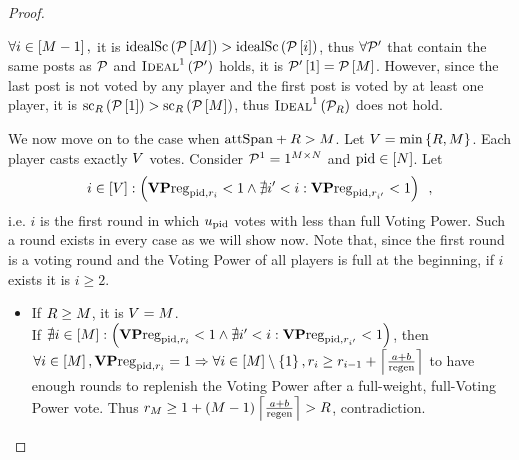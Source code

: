 \begin{proof}
\begin{itemize}
    $\forall i \in \left[\postlen - 1\right],$ it is
    $\idsc{\postlist\left[\postlen\right]} >
    \idsc{\postlist\left[i\right]}$, thus $\forall \postlist'$ that
    contain the same posts as $\postlist$ and
    $\textsc{Ideal}^1\left(\postlist'\right)$ holds, it is
    $\postlist'\left[1\right] = \postlist\left[\postlen\right]$. However,
    since the last post is not voted by any player and the first post is voted
    by at least one player, it is
    $\mathrm{sc}_\rounds\left(\postlist\left[1\right]\right) >
    \mathrm{sc}_\rounds\left(\postlist\left[\postlen\right]\right)$, thus
    $\textsc{Ideal}^1\left(\postlist_\rounds\right)$ does not hold.

    We now move on to the case when $\attspan + \rounds > \postlen$. Let
    $\votenum = \min{\left\{\rounds, \postlen\right\}}$. Each player casts
    exactly $\votenum$ votes. Consider $\postlist^1 = 1^{\postlen \times
    \playerlen}$ and $\pid \in \left[\playerlen\right]$. Let
    \begin{equation*}
      i \in \left[\votenum\right] :\left(\votpowvecreg_{\pid, \round_i} < 1
      \wedge \nexists i' < i: \votpowvecreg_{\pid, \round_{i'}} < 1\right)
      \enspace,
    \end{equation*}
    i.e. $i$ is the first round in which $u_\pid$ votes with less than full
    Voting Power. Such a round exists in every case as we will show now. Note
    that, since the first round is a voting round and the Voting Power of all
    players is full at the beginning, if $i$ exists it is $i \geq 2$.

    \begin{itemize}
      \item If $\rounds \geq \postlen$, it is $\votenum = \postlen$. \\
      If $\nexists i \in \left[\postlen\right] :\left(\votpowvecreg_{\pid,
      \round_i} < 1 \wedge \nexists i' < i: \votpowvecreg_{\pid, \round_{i'}} <
      1\right)$, then $\forall i \in \left[\postlen\right], \votpowvecreg_{\pid,
      \round_i} = 1 \Rightarrow \forall i \in \left[\postlen\right] \setminus
      \left\{1\right\}, \round_i \geq \round_{i - 1} + \ceil*{\frac{a +
      b}{\regen}}$ to have enough rounds to replenish the Voting Power after a
      full-weight, full-Voting Power vote. Thus $\round_\postlen \geq 1 +
      \left(\postlen - 1\right)\ceil*{\frac{a + b}{\regen}} > \rounds$,
      contradiction.


\end{itemize}
\end{itemize}
\end{proof}
